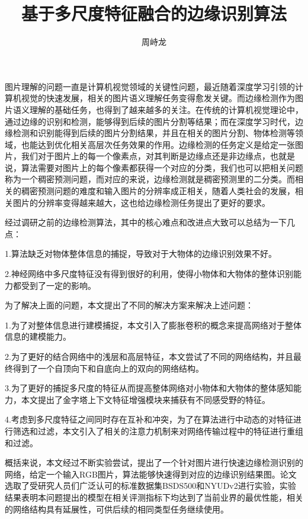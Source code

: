 \documentclass[master]{thesis-uestc}
\title{基于多尺度特征融合的边缘识别算法}{The Edge Detection Algorithm Based On Multi-level Representations}
\author{周峙龙}{Zhilong Zhou}
\begin{document}
\makecover
\originalitydeclaration
\begin{chineseabstract}

图片理解的问题一直是计算机视觉领域的关键性问题，最近随着深度学习引领的计算机视觉的快速发展，相关的图片语义理解任务变得愈发关键。而边缘检测作为图片语义理解的基础任务，也得到了越来越多的关注。在传统的计算机视觉理论中，通过边缘的识别和检测，能够得到后续的图片分割等结果；而在深度学习时代，边缘检测和识别能得到后续的图片分割结果，并且在相关的图片分割、物体检测等领域，也能达到优化相关高层次任务效果的作用。边缘检测的任务定义是给定一张图片，我们对于图片上的每一个像素点，对其判断是边缘点还是非边缘点，也就是说，算法需要对图片上的每个像素都获得一个对应的分类，我们也可以把相关问题称为一个稠密预测问题，而对应的来说，边缘检测就是稠密预测里的二分类。而相关的稠密预测问题的难度和输入图片的分辨率成正相关，随着人类社会的发展，相关图片的分辨率变得越来越大，这也给边缘检测任务提出了更好的要求。

经过调研之前的边缘检测算法，其中的核心难点和改进点大致可以总结为一下几点：

1.算法缺乏对物体整体信息的捕捉，导致对于大物体的边缘识别效果不好。

2.神经网络中多尺度特征没有得到很好的利用，使得小物体和大物体的整体识别能力都受到了一定的影响。


为了解决上面的问题，本文提出了不同的解决方案来解决上述问题： 

1.为了对整体信息进行建模捕捉，本文引入了膨胀卷积的概念来提高网络对于整体信息的建模能力。 

2.为了更好的结合网络中的浅层和高层特征，本文尝试了不同的网络结构，并且最终得到了一个自顶向下和自底向上的双向的网络结构。

3.为了更好的捕捉多尺度的特征从而提高整体网络对小物体和大物体的整体感知能力，本文提出了金字塔上下文特征增强模块来捕获有不同感受野的特征。 

4.考虑到多尺度特征之间同时存在互补和冲突，为了在算法进行中动态的对特征进行筛选和过滤，本文引入了相关的注意力机制来对网络传输过程中的特征进行重组和过滤。

概括来说，本文经过不断实验尝试，提出了一个针对图片进行快速边缘检测识别的网络，给定一个输入RGB图片，算法能够快速得到对应的边缘识别结果图。论文选取了受研究人员们广泛认可的标准数据集BSDS500和NYUDv2进行实验，实验结果表明本问题提出的模型在相关评测指标下均达到了当前业界的最优性能，相关的网络结构具有延展性，可供后续的相同类型任务继续使用。

\end{chineseabstract}
\end{document}
